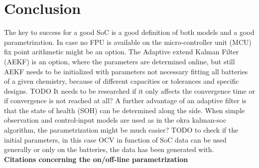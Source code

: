 %
%


\chapter{Conclusion}

The key to success for a good SoC is a good definition of both models and a good parametrization. %
In case no FPU is available on the micro-controller unit (MCU) fix point arithmetic might be an option. 
The Adaptive extend Kalman Filter (AEKF) is an option, where the parameters are determined online, but still AEKF needs to be initialized with parameters not necessary fitting all batteries of a given chemistry, because of different capacities or tolerances and specific designs. 
TODO It needs to be researched if it only affects the convergence time or if convergence is not reached at all? A further advantage of an adaptive filter is that the state of health (SOH) can be determined along the side. 
When simple observation and control-input models are used as in the okra kalman-soc algorithm, the parametrization might be much easier?
TODO to check if the initial parameters, in this case OCV in function of SoC data can be used generally or only on the batteries, the data has been generated with. \\

\textbf{Citations concerning the on/off-line parametrization} \\


